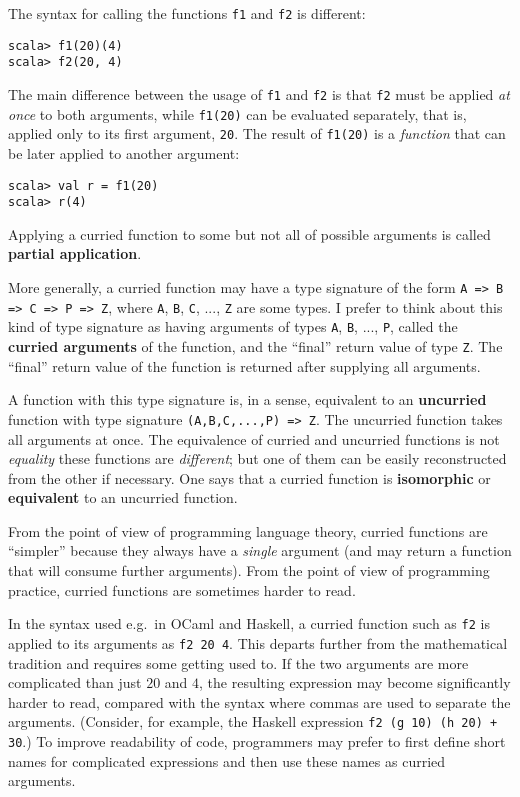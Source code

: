 The syntax for calling the functions \lstinline!f1! and \lstinline!f2!
is different:
\begin{lstlisting}
scala> f1(20)(4)
scala> f2(20, 4)
\end{lstlisting}
The main difference between the usage of \lstinline!f1! and \lstinline!f2!
is that \lstinline!f2! must be applied \emph{at once} to both arguments,
while \lstinline!f1(20)! can be evaluated separately, \textendash{}
that is, applied only to its first argument, \lstinline!20!. The
result of \lstinline!f1(20)! is a \emph{function} that can be later
applied to another argument:
\begin{lstlisting}
scala> val r = f1(20)
scala> r(4)
\end{lstlisting}

Applying a curried function to some but not all of possible arguments
is called \textbf{partial application}.

More generally, a curried function may have a type signature of the
form \lstinline!A => B => C => P => Z!, where \lstinline!A!, \lstinline!B!,
\lstinline!C!, ..., \lstinline!Z! are some types. I prefer to think
about this kind of type signature as having arguments of types \lstinline!A!,
\lstinline!B!, ..., \lstinline!P!, called the \textbf{curried
arguments} of the function, and the ``final'' return value of type
\lstinline!Z!. The ``final'' return value of the function is returned
after supplying all arguments.

A function with this type signature is, in a sense, equivalent to
an \textbf{uncurried} function with type
signature \lstinline!(A,B,C,...,P) => Z!. The uncurried function
takes all arguments at once. The equivalence of curried and uncurried
functions is not \emph{equality}  \textendash{}  these functions are
\emph{different}; but one of them can be easily reconstructed from
the other if necessary. One says that a curried function is \textbf{isomorphic}
or \textbf{equivalent} to an uncurried function.

From the point of view of programming language theory, curried functions
are ``simpler'' because they always have a \emph{single} argument
(and may return a function that will consume further arguments). From
the point of view of programming practice, curried functions are sometimes
harder to read.

In the syntax used e.g.\ in OCaml and Haskell, a curried function
such as \lstinline!f2! is applied to its arguments as \lstinline!f2 20 4!.
This departs further from the mathematical tradition and requires
some getting used to. If the two arguments are more complicated than
just $20$ and $4$, the resulting expression may become significantly
harder to read, compared with the syntax where commas are used to
separate the arguments. (Consider, for example, the Haskell expression
\lstinline!f2 (g 10) (h 20) + 30!.) To improve readability of code,
programmers may prefer to first define short names for complicated
expressions and then use these names as curried arguments.

